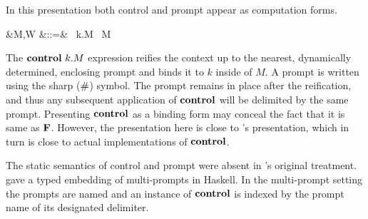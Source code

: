 \documentclass[12pt,phd,lfcs,twoside,openright,logo,leftchapter,normalheadings]{infthesis}
\theoremstyle{plain}
\theoremstyle{definition}
\begin{document}
In this presentation both control and prompt appear as computation
forms.
%
\begin{syntax}
     &M,W \in \CompCat &::=& \cdots \mid \Control~k.M \mid \Prompt~M
\end{syntax}
%
The $\mathbf{control}~k.M$ expression reifies the context up to the nearest,
dynamically determined, enclosing prompt and binds it to $k$ inside of
$M$. A prompt is written using the sharp ($\#$) symbol.
%
The prompt remains in place after the reification, and thus any
subsequent application of $\mathbf{control}$ will be delimited by the same
prompt.
%
Presenting $\mathbf{control}$ as a binding form may conceal the fact that it
is same as $\mathbf{F}$. However, the presentation here is close to
\citeauthor{SitaramF90}'s presentation, which in turn is close to
actual implementations of $\mathbf{control}$.

The static semantics of control and prompt were absent in
\citeauthor{Felleisen88}'s original treatment.
%
%
\citet{DybvigJS07} gave a typed embedding of multi-prompts in
Haskell. In the multi-prompt setting the prompts are named and an
instance of $\mathbf{control}$ is indexed by the prompt name of its designated
delimiter.



\end{document}
